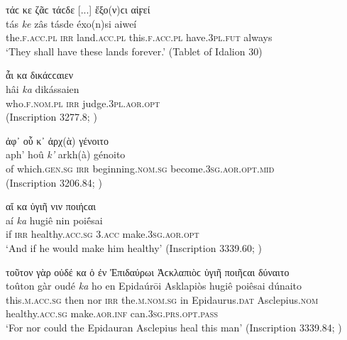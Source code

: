 \begin{exe}
\ex τάϲ κε ζᾶϲ τάϲδε {[}...{]} ἔξο(ν)ϲι αἰϝεί\\
\gll tás \emph{ke} zâs tásde éxo(n)si aiweí\\
the.\textsc{f.acc.pl} \textsc{irr} land.\textsc{acc.pl} this.\textsc{f.acc.pl} have.\textsc{3pl.fut} always\\
\trans `They shall have these lands forever.' (Tablet of Idalion 30)
\label{Idalion30}
\end{exe}

\begin{exe}
\ex ἇι κα δικάϲϲαιεν\\
\gll hâi \emph{ka} dikássaien\\
who.\textsc{f.nom.pl} \textsc{irr} judge.\textsc{3pl.aor.opt}\\ 
\trans (Inscription 3277.8; \citealp[127]{Prellwitz1889})
\label{Argive}
\end{exe}

\begin{exe}
\ex ἀφ᾽ οὗ κ᾽ ἀρχ(ὰ) γένοιτο\\
\gll aph' hoû \emph{k'} arkh(à) génoito\\
of which.\textsc{gen.sg} \textsc{irr} beginning.\textsc{nom.sg} become.\textsc{3sg.aor.opt.mid}\\
\trans (Inscription 3206.84; \citealp[95]{Blass1888})
\label{Korkyra}
\end{exe}

\begin{exe}
\ex αἴ κα ὑγιῆ νιν ποιήϲαι\\
\gll aí \emph{ka} hugiê nin poiḗsai\\
if \textsc{irr} healthy.\textsc{acc.sg} \textsc{3.acc} make.\textsc{3sg.aor.opt}\\
\trans `And if he would make him healthy' (Inscription 3339.60; \citealp[151--157]{Prellwitz1889})
\label{Epidaurian60}
\end{exe}

\begin{exe}
\ex τοῦτον γὰρ οὐδέ κα ὁ ἐν Ἐπιδαύρωι Ἀϲκλαπιὸϲ ὑγιῆ ποιῆϲαι δύναιτο\\
\gll toûton gàr oudé \emph{ka} ho en Epidaúrōi Asklapiòs hugiê poiêsai dúnaito\\
this.\textsc{m.acc.sg} then nor \textsc{irr} the.\textsc{m.nom.sg} in Epidaurus.\textsc{dat} Asclepius.\textsc{nom} healthy.\textsc{acc.sg} make.\textsc{aor.inf} can.\textsc{3sg.prs.opt.pass}\\
\trans `For nor could the Epidauran Asclepius heal this man' (Inscription 3339.84; \citealp[151--157]{Prellwitz1889})
\label{Epidaurian84}
\end{exe}

